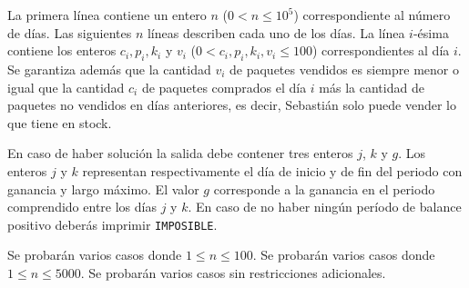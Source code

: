 \documentclass{oci}
\begin{document}
\begin{inputDescription}
La primera línea contiene un entero $n$ ($0 < n \leq 10^5$) correspondiente al número de días.
Las siguientes $n$ líneas describen cada uno de los días.
La línea $i$-ésima contiene los enteros $c_i, p_i, k_i$ y $v_i$ ($0 < c_i, p_i, k_i, v_i \leq 100$)
correspondientes al día $i$.
Se garantiza además que la cantidad $v_i$ de paquetes vendidos es siempre menor o igual
que la cantidad $c_i$ de paquetes comprados el día $i$ más la cantidad de paquetes no vendidos
en días anteriores, es decir, Sebastián solo puede vender lo que tiene en stock.
\end{inputDescription}

\begin{outputDescription}
En caso de haber solución la salida debe contener tres enteros $j$, $k$ y $g$.
Los enteros $j$ y $k$ representan respectivamente el día de inicio y de fin del periodo con ganancia
y largo máximo.
El valor $g$ corresponde a la ganancia en el periodo comprendido entre los días $j$ y $k$.
En caso de no haber ningún período de balance positivo deberás imprimir \verb|IMPOSIBLE|.
\end{outputDescription}

\begin{scoreDescription}
  Se probarán varios casos donde $1 \leq n \leq 100$.
  Se probarán varios casos donde $1 \leq n \leq 5000$.
  Se probarán varios casos sin restricciones adicionales.
\end{scoreDescription}

\begin{sampleDescription}
\end{sampleDescription}
\end{document}
